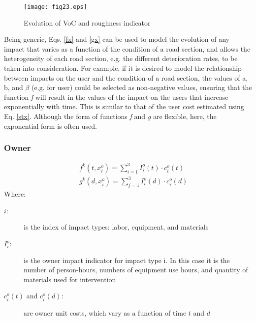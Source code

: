 \begin{figure}[h]
\begin{center}
\texttt{[image: fig23.eps]}
\caption{Evolution of VoC and roughness indicator}\label{fig23}
\end{center}
\end{figure}
 
Being generic, Eqs. \eqref{fx} and \eqref{gx} can be used to model the evolution of any impact that varies as a function of the condition of a road section, and allows the heterogeneity of each road section, e.g. the different deterioration rates, to be taken into consideration. For example, if it is desired to model the relationship between impacts on the user and the condition of a road section, the values of a, b, and \textit{$\beta{}$} (e.g. for user) could be selected as non-negative values, ensuring that the function \textit{f }will result in the values of the impact on the users that increase exponentially with time. This is similar to that of the user cost estimated using Eq. \eqref{stx}. Although the form of functions \textit{f} and \textit{g} are flexible, here, the exponential form is often used. 
\subsubsection{Owner}
\begin{eqnarray}
      && f_{}^k(t,x_i^o) = \sum\limits_{i = 1}^3 {I_i^o(t) \cdot c_i^o(t)} \label{fx1}\\
      && g_{}^k(d,x_i^o) = \sum\limits_{j = 1}^3 {I_i^o(d) \cdot c_i^o(d)} \label{gx1}
\end{eqnarray}
Where:\\
\begin{adjustwidth}{1cm}{}
\begin{description}
\item[$i$:] is the index of impact types: labor, equipment, and materials
\item[$I_i^o$:] is the owner impact indicator for impact type i. In this case it is the number of person-hours, numbers of equipment use hours, and quantity of materials used for intervention
\item[$c_i^o(t)$ and $c_i^o(d)$:] are owner unit costs, which vary as a function of time $t$ and $d$
\end{description}
\end{adjustwidth}
